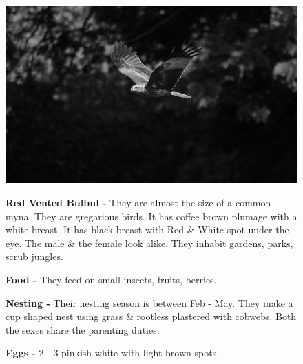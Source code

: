 \begin{figure}[H]
\begin{center}
\includegraphics{figure/Land_birds/01_pariah_kite/pariah-kite.eps}
\end{center}
\medskip
\noindent
{\bf Red Vented Bulbul -} They are almost the size of a common myna. They are gregarious birds. It has coffee brown plumage with a white breast. It has black breast with Red \& White spot under the eye. The male \& the female look alike. They inhabit gardens, parks, scrub jungles.

\medskip
{\bf Food -} They feed on small insects, fruits, berries.

{\bf Nesting -} Their nesting season is between Feb - May. They make a cup shaped nest using grass \& rootless plastered with cobwebs. Both the sexes share the parenting duties.

{\bf Eggs -} 2 - 3 pinkish white with light brown spots.
\end{figure}

\vfill\eject

~\phantom{a}
\vfill

